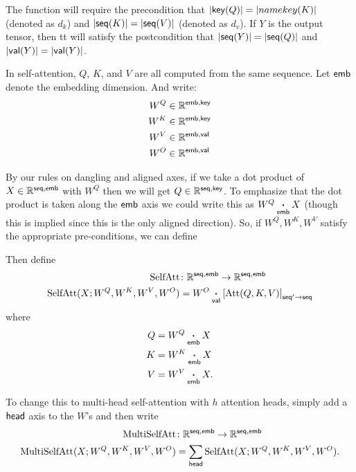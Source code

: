 \documentclass{article}
\begin{document}
The function will require the precondition that $|\name{key}(Q)|=|name{key}(K)|$ (denoted as $d_k$) and $|\name{seq}(K)|=|\name{seq}(V)|$ (denoted as $d_v$).
If $Y$ is the output tensor, then tt will satisfy the postcondition that $|\name{seq}(Y)|=|\name{seq}(Q)|$ and $|\name{val}(Y)|=|\name{val}(Y)|$. 






In self-attention, $Q$, $K$, and $V$ are all computed from the same sequence.  
Let $\name{emb}$ denote the embedding dimension.
And write:
\begin{align*}
  W^Q &\in \mathbb{R}^{\name{emb}, \name{key}} \\
  W^K &\in \mathbb{R}^{\name{emb}, \name{key}} \\
  W^V &\in \mathbb{R}^{\name{emb}, \name{val}} \\
  W^O &\in \mathbb{R}^{\name{emb}, \name{val}}
\end{align*}

By our rules on dangling and aligned axes, if we take a dot product of $X \in \mathbb{R}^{\name{seq},\name{emb}}$ with $W^Q$ then we will get 
$Q \in \mathbb{R}^{\name{seq},\name{key}}$. 
To emphasize that the dot product is taken along the $\name{emb}$ axis  we could write this as $W^Q \ndot{emb} X$ (though this is implied since this is the only aligned direction).
So, if $W^Q,W^K,W^V$ satisfy the appropriate pre-conditions, we can define 


Then define
\begin{align*}
  \text{SelfAtt} &\colon \mathbb{R}^{\name{seq},\name{emb}} \rightarrow \mathbb{R}^{\name{seq},\name{emb}} \\
  \text{SelfAtt}(X; W^Q, W^K, W^V, W^O) &= W^O \ndot{val} \nmov{seq'}{seq}{\text{Att}(Q, K, V)}
\end{align*}
where
\begin{align*}
  Q &= W^Q \ndot{emb} X \\
  K &= W^K \ndot{emb} X \\
  V &= W^V \ndot{emb} X.
\end{align*}

To change this to multi-head self-attention with $h$ attention heads, simply add a $\name{head}$ axis to the $W$'s and then write 
\begin{align*}
\text{MultiSelfAtt} &\colon \mathbb{R}^{\name{seq},\name{emb}} \rightarrow \mathbb{R}^{\name{seq},\name{emb}} \\
\text{MultiSelfAtt}(X; W^Q, W^K, W^V, W^O) &= \nsum{head} \text{SelfAtt}(X; W^Q, W^K, W^V, W^O).
\end{align*}
\end{document}
